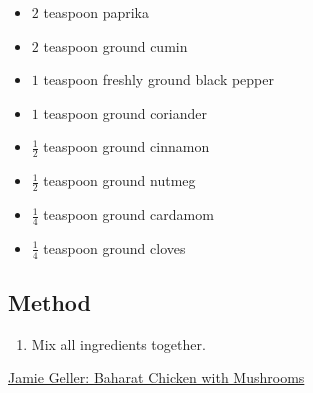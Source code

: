 \documentclass[11pt,a4paper]{article}
\begin{document}
\begin{itemize}
  \item $ 2 $ teaspoon paprika
  \item $ 2 $ teaspoon ground cumin
  \item $ 1 $ teaspoon freshly ground black pepper
  \item $ 1 $ teaspoon ground coriander
  \item $ \frac{1}{2} $ teaspoon ground cinnamon
  \item $ \frac{1}{2} $ teaspoon ground nutmeg
  \item $ \frac{1}{4} $ teaspoon ground cardamom
  \item $ \frac{1}{4} $ teaspoon ground cloves
\end{itemize}

\medskip

\subsection*{Method}

\begin{enumerate}
  \item Mix all ingredients together.
\end{enumerate}

\href{https://jamiegeller.com/recipes/baharat-chicken-with-mushrooms/}{Jamie Geller: Baharat Chicken with Mushrooms}
\end{document}
